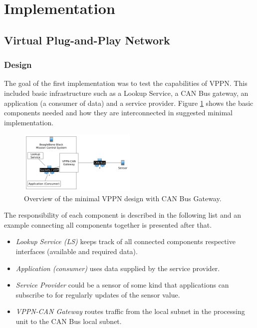 \section{Implementation}\label{sec:implementation}
\subsection{Virtual Plug-and-Play Network}
\subsubsection{Design}
The goal of the first implementation was to test the capabilities of VPPN.
This included basic infrastructure such as a Lookup Service, a CAN Bus
gateway, an application (a consumer of data) and a service provider. Figure
\ref{fig:vppn-overview} shows the basic components needed and how they are
interconnected in suggested minimal implementation.

\begin{figure}[h]
    \includegraphics[width=0.5\textwidth]{./figure/vppn-overview.png}
    \caption{Overview of the minimal VPPN design with CAN Bus Gateway.}
    \label{fig:vppn-overview}
\end{figure}

The responsibility of each component is described in the following list and an
example connecting all components together is presented after that.
\begin{itemize}
    \item {\em Lookup Service (LS)} keeps track of all connected components
        respective interfaces (available and required data).
    \item {\em Application (consumer)} uses data supplied by the service
        provider.
    \item {\em Service Provider} could be a sensor of some kind that
        applications can subscribe to for regularly updates of the sensor value.
    \item {\em VPPN-CAN Gateway} routes traffic from the local subnet in the
        processing unit to the CAN Bus local subnet.
\end{itemize}

